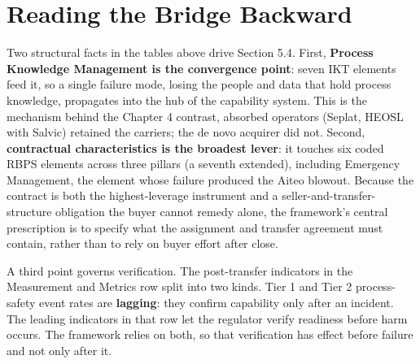 \hypertarget{reading-the-bridge-backward}{%
\section{Reading the Bridge
Backward}\label{reading-the-bridge-backward}}

Two structural facts in the tables above drive Section 5.4. First,
\textbf{Process Knowledge Management is the convergence point}: seven
IKT elements feed it, so a single failure mode, losing the people and
data that hold process knowledge, propagates into the hub of the
capability system. This is the mechanism behind the Chapter 4 contrast,
absorbed operators (Seplat, HEOSL with Salvic) retained the carriers;
the de novo acquirer did not. Second, \textbf{contractual
characteristics is the broadest lever}: it touches six coded RBPS
elements across three pillars (a seventh extended), including Emergency
Management, the element whose failure produced the Aiteo blowout.
Because the contract is both the highest-leverage instrument and a
seller-and-transfer-structure obligation the buyer cannot remedy alone,
the framework's central prescription is to specify what the assignment
and transfer agreement must contain, rather than to rely on buyer effort
after close.

A third point governs verification. The post-transfer indicators in the
Measurement and Metrics row split into two kinds. Tier 1 and Tier 2
process-safety event rates are \textbf{lagging}: they confirm capability
only after an incident. The leading indicators in that row let the
regulator verify readiness before harm occurs. The framework relies on
both, so that verification has effect before failure and not only after
it.

